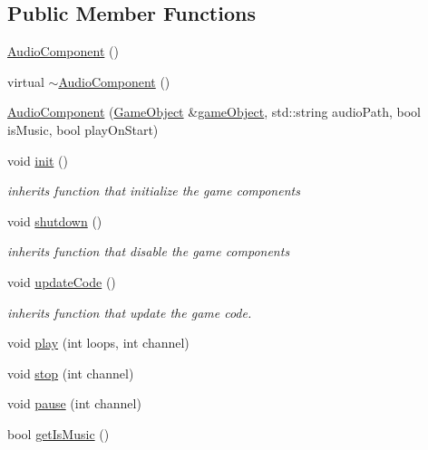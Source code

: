 \subsection*{Public Member Functions}
\begin{DoxyCompactItemize}
\item 
\hyperlink{classengine_1_1_audio_component_aaea64af7cd81778f6737f0a4bee35394}{Audio\+Component} ()
\item 
virtual \hyperlink{classengine_1_1_audio_component_a68bf2351458d61601aad7abeb3f58588}{$\sim$\+Audio\+Component} ()
\item 
\hyperlink{classengine_1_1_audio_component_a59af70319c3b0c81a66b5c1b9525cb46}{Audio\+Component} (\hyperlink{classengine_1_1_game_object}{Game\+Object} \&\hyperlink{classengine_1_1_component_ad4a4865ca4df98ebea34d04a4ec5ad07}{game\+Object}, std\+::string audio\+Path, bool is\+Music, bool play\+On\+Start)
\item 
void \hyperlink{classengine_1_1_audio_component_a61f7e9f09253a0619ed979276267150c}{init} ()
\begin{DoxyCompactList}\small\item\em inherits function that initialize the game components \end{DoxyCompactList}\item 
void \hyperlink{classengine_1_1_audio_component_acb42c8fa38793ff0fe6c0652bbb9eac9}{shutdown} ()
\begin{DoxyCompactList}\small\item\em inherits function that disable the game components \end{DoxyCompactList}\item 
void \hyperlink{classengine_1_1_audio_component_aa35e7f57c104c2281680bb13764e4ef0}{update\+Code} ()
\begin{DoxyCompactList}\small\item\em inherits function that update the game code. \end{DoxyCompactList}\item 
void \hyperlink{classengine_1_1_audio_component_a09cc2c39a6bb97c79257a4593ab57e42}{play} (int loops, int channel)
\item 
void \hyperlink{classengine_1_1_audio_component_aa7274401541925ff8b8a639de01b2b7e}{stop} (int channel)
\item 
void \hyperlink{classengine_1_1_audio_component_adbc0fe9c86ccabf06cc685882e98701f}{pause} (int channel)
\item 
bool \hyperlink{classengine_1_1_audio_component_a3aeb1bb7591da6da496461a8384cff9c}{get\+Is\+Music} ()
\end{DoxyCompactItemize}
